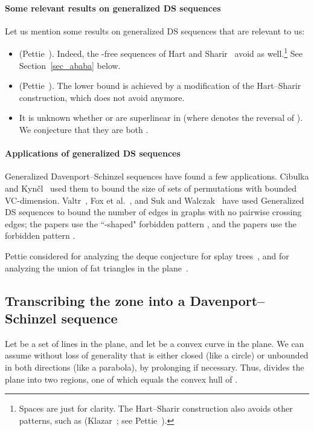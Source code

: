\documentclass[11pt]{article}
\theoremstyle{definition}
\theoremstyle{remark}
\begin{document}
\paragraph{Some relevant results on generalized DS sequences}
Let us mention some results on generalized DS sequences that are relevant to us:
\begin{itemize}
\item  (Pettie~\cite{pettie_origins}). Indeed, the -free sequences of Hart and Sharir~\cite{HS} avoid  as well.\footnote{Spaces are just for clarity. The Hart--Sharir construction also avoids other patterns, such as  (Klazar~\cite{klazar_93}; see Pettie~\cite{pettie_origins}).} See Section~\ref{sec_ababa} below.

\item  (Pettie~\cite{pettie_matrix}). The lower bound is achieved by a modification of the Hart--Sharir construction, which does not avoid  anymore.

\item It is unknown whether  or  are superlinear in  (where  denotes the reversal of ). We conjecture that they are both .
\end{itemize}

\paragraph{Applications of generalized DS sequences}
Generalized Davenport--Schinzel sequences have found a few applications. Cibulka and Kyn\v cl~\cite{CK} used them to bound the size of sets of permutations with bounded VC-dimension. Valtr~\cite{valtr}, Fox et al.~\cite{FPS}, and Suk and Walczak~\cite{Suk-W} have used Generalized DS sequences to bound the number of edges in graphs with no  pairwise crossing edges; the papers \cite{valtr,FPS} use the ``-shaped" forbidden pattern , and the papers \cite{FPS,Suk-W} use the forbidden pattern .

Pettie considered  for analyzing the deque conjecture for splay trees~\cite{pettie_splay}, and  for analyzing the union of fat triangles in the plane~\cite{pettie_forbid}.

\subsection{Transcribing the zone into a Davenport--Schinzel sequence}\label{subsec_Lprime}

Let  be a set of  lines in the plane, and let  be a convex curve in the plane. We can assume without loss of generality that  is either closed (like a circle) or unbounded in both directions (like a parabola), by prolonging  if necessary. Thus,  divides the plane into two regions, one of which equals the convex hull of .
\end{document}

